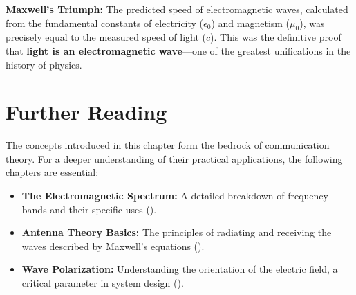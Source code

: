 \begin{keyconcept}
    \textbf{Maxwell's Triumph:} The predicted speed of electromagnetic waves, calculated from the fundamental constants of electricity ($\epsilon_0$) and magnetism ($\mu_0$), was precisely equal to the measured speed of light ($c$). This was the definitive proof that \textbf{light is an electromagnetic wave}---one of the greatest unifications in the history of physics.
\end{keyconcept}


\section{Further Reading}

\begin{importantbox}[title={Further Reading}]
    The concepts introduced in this chapter form the bedrock of communication theory. For a deeper understanding of their practical applications, the following chapters are essential:
    \begin{itemize}
        \item \textbf{The Electromagnetic Spectrum:} A detailed breakdown of frequency bands and their specific uses ().
        \item \textbf{Antenna Theory Basics:} The principles of radiating and receiving the waves described by Maxwell's equations ().
        \item \textbf{Wave Polarization:} Understanding the orientation of the electric field, a critical parameter in system design ().
    \end{itemize}
\end{importantbox}